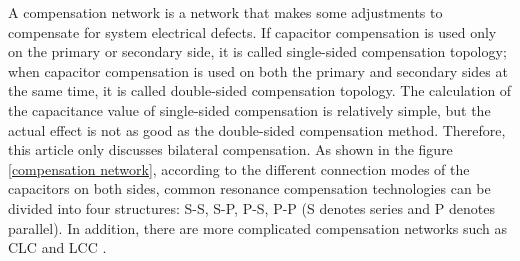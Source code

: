 A compensation network is a network that makes some adjustments to compensate for system electrical defects. If capacitor compensation is used only on the primary or secondary side, it is called single-sided compensation topology; when capacitor compensation is used on both the primary and secondary sides at the same time, it is called double-sided compensation topology. The calculation of the capacitance value of single-sided compensation is relatively simple, but the actual effect is not as good as the double-sided compensation method. Therefore, this article only discusses bilateral compensation. As shown in the figure \ref{compensation network}, according to the different connection modes of the capacitors on both sides, common resonance compensation technologies can be divided into four structures: S-S, S-P, P-S, P-P (S denotes series and P denotes parallel). In addition, there are more complicated compensation networks such as CLC and LCC \cite{Jiang2017, Zhang2016}.


